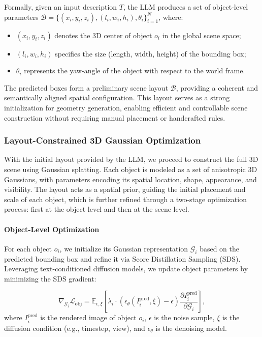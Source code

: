 \documentclass[sigconf]{acmart}
\begin{document}
Formally, given an input description $T$, the LLM produces a set of object-level parameters $\mathcal{B} = \{(x_i, y_i, z_i), (l_i, w_i, h_i), \theta_i\}_{i=1}^N$, where:
\begin{itemize}
    \item $(x_i, y_i, z_i)$ denotes the 3D center of object $o_i$ in the global scene space;
    \item $(l_i, w_i, h_i)$ specifies the size (length, width, height) of the bounding box;
    \item $\theta_i$ represents the yaw-angle of the object with respect to the world frame.
\end{itemize}

The predicted boxes form a preliminary scene layout $\mathcal{B}$, providing a coherent and semantically aligned spatial configuration. This layout serves as a strong initialization for geometry generation, enabling efficient and controllable scene construction without requiring manual placement or handcrafted rules.


\subsubsection*{\textbf{Layout-Constrained 3D Gaussian Optimization}}

With the initial layout provided by the LLM, we proceed to construct the full 3D scene using Gaussian splatting. Each object is modeled as a set of anisotropic 3D Gaussians, with parameters encoding its spatial location, shape, appearance, and visibility. The layout acts as a spatial prior, guiding the initial placement and scale of each object, which is further refined through a two-stage optimization process: first at the object level and then at the scene level.

\paragraph{Object-Level Optimization}

For each object $o_i$, we initialize its Gaussian representation $\mathcal{G}_i$ based on the predicted bounding box and refine it via Score Distillation Sampling (SDS). Leveraging text-conditioned diffusion models\cite{shi2023mvdream,guan2025learning}, we update object parameters by minimizing the SDS gradient:

\begin{equation}
    \nabla_{\mathcal{G}_i} \mathcal{L}_{\text{obj}} = \mathbb{E}_{\epsilon, \xi} \left[ \lambda_{i} \cdot \left( \epsilon_{\theta}\left(I_i^{\text{pred}}, \xi \right) - \epsilon \right) \frac{\partial I_i^{\text{pred}}}{\partial \mathcal{G}_{i}} \right],
\end{equation}
where $I_i^{\text{pred}}$ is the rendered image of object $o_i$, $\epsilon$ is the noise sample, $\xi$ is the diffusion condition (e.g., timestep, view), and $\epsilon_\theta$ is the denoising model. 
\end{document}
